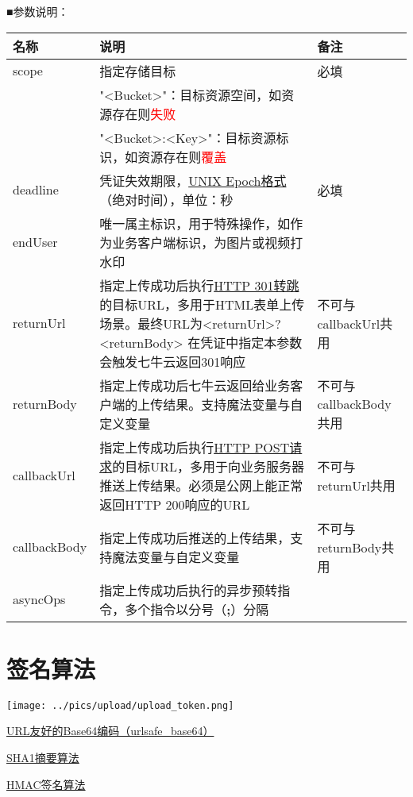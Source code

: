 \documentclass[11pt, oneside]{book}
\newcommand{\qblock}[1]{
\vspace{0.1em}
\noindent
#1\par
\vspace{0.1em}
}
\newcommand{\qtable}[1]{\footnotesize\vspace{0.5em}#1\vspace{0.5em}\normalsize}
\begin{document}
\qblock{■\thinspace 参数说明：}
\qtable{
\def\arraystretch{2}
\begin{tabular}{|l|p{25em}|p{8em}|}
\hline
名称 & 说明 & 备注 \\
\hline
scope & 指定存储目标 & 必填 \\
\cline{2-2}
      & "<Bucket>"：目标资源空间，如资源存在则\textcolor{red}{失败} & \\
\cline{2-2}
      & "<Bucket>:<Key>"：目标资源标识，如资源存在则\textcolor{red}{覆盖} & \\
\hline
deadline & 凭证失效期限，\href{http://en.wikipedia.org/wiki/Unix_time}{UNIX Epoch格式}（绝对时间），单位：秒 & 必填 \\
\hline
endUser & 唯一属主标识，用于特殊操作，如作为业务客户端标识，为图片或视频打水印 & \\
\hline
returnUrl & 指定上传成功后执行\href{http://en.wikipedia.org/wiki/HTTP_301}{HTTP 301转跳}的目标URL，多用于HTML表单上传场景。最终URL为<returnUrl>?<returnBody> \newline 在凭证中指定本参数会触发七牛云返回301响应 & 不可与callbackUrl共用 \\
\hline
returnBody & 指定上传成功后七牛云返回给业务客户端的上传结果。支持魔法变量与自定义变量 & 不可与callbackBody共用 \\
\hline
callbackUrl & 指定上传成功后执行\href{http://en.wikipedia.org/wiki/POST_(HTTP)}{HTTP POST请求}的目标URL，多用于向业务服务器推送上传结果。必须是公网上能正常返回HTTP 200响应的URL & 不可与returnUrl共用 \\
\hline
callbackBody & 指定上传成功后推送的上传结果，支持魔法变量与自定义变量 & 不可与returnBody共用 \\
\hline
asyncOps & 指定上传成功后执行的异步预转指令，多个指令以分号（{\bf ;}）分隔 & \\
\hline
\end{tabular}
}

\section{签名算法}

\begin{center}
\texttt{[image: ../pics/upload/upload\_token.png]}
\end{center}

\href{http://zh.wikipedia.org/wiki/Base64#.E5.9C.A8URL.E4.B8.AD.E7.9A.84.E5.BA.94.E7.94.A8}{URL友好的Base64编码（urlsafe\_base64）}\par
\href{http://en.wikipedia.org/wiki/SHA-1}{SHA1摘要算法}\par
\href{http://en.wikipedia.org/wiki/Hash-based_message_authentication_code}{HMAC签名算法}\par
\end{document}
